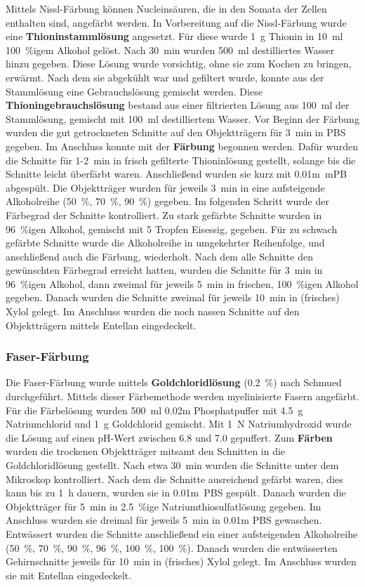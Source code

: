 \documentclass[12pt,a4paper,pdftex]{article}
\begin{document}
Mittels Nissl-Färbung können Nucleinsäuren, die in den Somata der Zellen enthalten sind, angefärbt werden. In Vorbereitung auf die Nissl-Färbung wurde eine \textbf{Thioninstammlösung} angesetzt. Für diese wurde 1~g Thionin in 10~ml 100~\%igem Alkohol gelöst. Nach 30~min wurden 500~ml destilliertes Wasser hinzu gegeben. Diese Lösung wurde vorsichtig, ohne sie zum Kochen zu bringen, erwärmt. Nach dem sie abgekühlt war und gefiltert wurde, konnte aus der Stammlösung eine Gebrauchslösung gemischt werden. Diese \textbf{Thioningebrauchslösung} bestand aus einer filtrierten Lösung aus 100~ml der Stammlösung, gemischt mit 100~ml destilliertem Wasser. Vor Beginn der Färbung wurden die gut getrockneten Schnitte auf den Objektträgern für 3~min in PBS gegeben. Im Anschluss konnte mit der \textbf{Färbung} begonnen werden. Dafür wurden die Schnitte für 1-2~min in frisch gefilterte Thioninlösung gestellt, solange bis die Schnitte leicht überfärbt waren. Anschließend wurden sie kurz mit 0.01m~mPB abgespült. Die Objektträger wurden für jeweils 3~min in eine aufsteigende Alkoholreihe (50~\%, 70~\%, 90~\%) gegeben. Im folgenden Schritt wurde der Färbegrad der Schnitte kontrolliert. Zu stark gefärbte Schnitte wurden in 96~\%igen Alkohol, gemischt mit 5 Tropfen Eisessig, gegeben. Für zu schwach gefärbte Schnitte wurde die Alkoholreihe in umgekehrter Reihenfolge, und anschließend auch die Färbung, wiederholt. Nach dem alle Schnitte den gewünschten Färbegrad erreicht hatten, wurden die Schnitte für 3~min in 96~\%igen Alkohol, dann zweimal für jeweils 5~min in frischen, 100~\%igen Alkohol gegeben. Danach wurden die Schnitte zweimal für jeweils 10~min in (frisches) Xylol gelegt. Im Anschluss wurden die noch nassen Schnitte auf den Objektträgern mittels Entellan eingedeckelt. 

\subsubsection{Faser-Färbung}

Die Faser-Färbung wurde mittels \textbf{Goldchloridlösung} (0.2~\%) nach Schmued durchgeführt. Mittels dieser Färbemethode werden myelinisierte Fasern angefärbt. Für die Färbelösung wurden 500~ml 0.02m Phosphatpuffer mit 4.5~g Natriumchlorid und 1~g Goldchlorid gemischt. Mit 1~N Natriumhydroxid wurde die Lösung auf einen pH-Wert zwischen 6.8 und 7.0 gepuffert. Zum \textbf{Färben} wurden die trockenen Objektträger mitsamt den Schnitten in die Goldchloridlösung gestellt. Nach etwa 30~min wurden die Schnitte unter dem Mikroskop kontrolliert. Nach dem die Schnitte ausreichend gefärbt waren, dies kann bis zu 1~h dauern, wurden sie in 0.01m~PBS gespült. Danach wurden die Objektträger für 5~min in 2.5~\%ige Natriumthiosulfatlösung gegeben. Im Anschluss wurden sie dreimal für jeweils 5~min in 0.01m PBS gewaschen. Entwässert wurden die Schnitte anschließend ein einer aufsteigenden Alkoholreihe (50~\%, 70~\%, 90~\%, 96~\%, 100~\%, 100~\%). Danach wurden die entwässerten Gehirnschnitte jeweils für 10~min in (frisches) Xylol gelegt. Im Anschluss wurden sie mit Entellan eingedeckelt.
\end{document}
